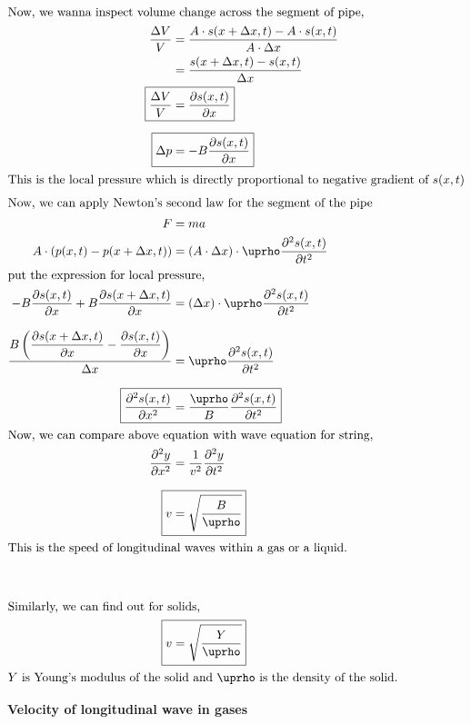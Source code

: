     \begin{align*}
        \intertext{Now, we wanna inspect volume change across the segment of pipe,}
        \dfrac{\Delta V}{V} &= \dfrac{A\cdot s(x+\Delta x, t) - A\cdot s(x, t)}{A\cdot\Delta x}\\
             &= \dfrac{s(x+\Delta x, t) - s(x, t)}{\Delta x} \\
        \Aboxed{\dfrac{\Delta V}{V} &= \dfrac{\partial s(x, t)}{\partial x}}\\[2mm]
        \Aboxed{\Delta p &= -B\dfrac{\partial s(x, t)}{\partial x}}\\
        \intertext{This is the local pressure which is directly proportional to negative gradient of $s(x, t)$}
        \intertext{Now, we can apply Newton's second law for the segment of the pipe}
        F &= ma\\
        A\cdot \left( p(x, t) - p(x+\Delta x, t) \right) &= \left(A\cdot \Delta x \right)\cdot\uprho \dfrac{\partial^2s(x, t)}{\partial t^2}\\
        \intertext{put the expression for local pressure,}
        -B\dfrac{\partial s(x, t)}{\partial x} + B\dfrac{\partial s(x+\Delta x, t)}{\partial x} &= \left(\Delta x \right)\cdot\uprho \dfrac{\partial^2s(x, t)}{\partial t^2}\\[3mm]
        \dfrac{B\left(\dfrac{\partial s(x+\Delta x, t)}{\partial x}-\dfrac{\partial s(x, t)}{\partial x}\right)}{\Delta x} &= \uprho \dfrac{\partial^2s(x, t)}{\partial t^2}\\[3mm]
        \Aboxed{\dfrac{\partial^2s(x, t)}{\partial x^2} &=\dfrac{\uprho}{B} \dfrac{\partial^2s(x, t)}{\partial t^2}}\\  
        \intertext{Now, we can compare above equation with wave equation for string,}
        \dfrac{\partial^2y}{\partial x^2} &= \dfrac{1}{v^2} \dfrac{\partial^2y}{\partial t^2}\\[3mm]
        \Aboxed{v &= \sqrt{\dfrac{B}{\uprho}}}\\
        \intertext{This is the speed of longitudinal waves within a gas or a liquid.}\\[5mm]
        \intertext{Similarly, we can find out for solids,}
        \Aboxed{v &= \sqrt{\dfrac{Y}{\uprho}}}\\
        \intertext{$Y$ is Young's modulus of the solid and $\uprho$ is the density of the solid.}
    \end{align*}
    \pagebreak
    \item \textbf{Velocity of longitudinal wave in gases}